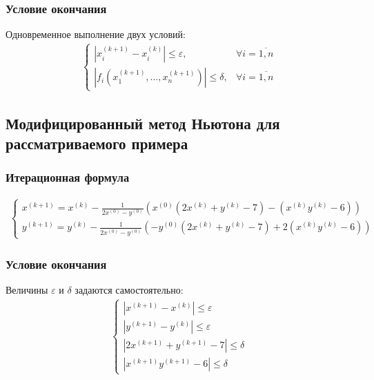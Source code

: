 \subsubsection*{Условие окончания}
Одновременное выполнение двух условий:
\begin{align}
	\begin{cases}
		|x_i^{(k+1)} - x_i^{(k)}| \leq \varepsilon,       & \forall i = \overline{1,n} \\
		|f_i(x_1^{(k+1)},\dots,x_n^{(k+1)})| \leq \delta, & \forall i = \overline{1,n}
	\end{cases}
\end{align}

\subsection{Модифицированный метод Ньютона для рассматриваемого примера}
\subsubsection*{Итерационная формула}
\begin{align}
	\begin{cases}
		x^{(k + 1)} = x^{(k)} - \frac{1}{2 x^{(0)} - y^{(0)}}(x^{(0)}(2x^{(k)}+y^{(k)}-7)-(x^{(k)}y^{(k)} - 6)) \\
		y^{(k+1)} = y^{(k)} - \frac{1}{2 x^{(0)} - y^{(0)}}(-y^{(0)}(2x^{(k)}+y^{(k)}-7)+2(x^{(k)}y^{(k)} - 6))
	\end{cases}
\end{align}
\subsubsection*{Условие окончания}
Величины \(\varepsilon\) и \(\delta\) задаются самостоятельно:
\begin{align}
	\begin{cases}
		|x^{(k+1)} - x^{(k)}| \leq \varepsilon   \\
		|y^{(k+1)} - y^{(k)}| \leq \varepsilon   \\
		|2x^{(k+1)} + y^{(k+1)} - 7| \leq \delta \\
		|x^{(k+1)}y^{(k+1)} - 6| \leq \delta
	\end{cases}
\end{align}
